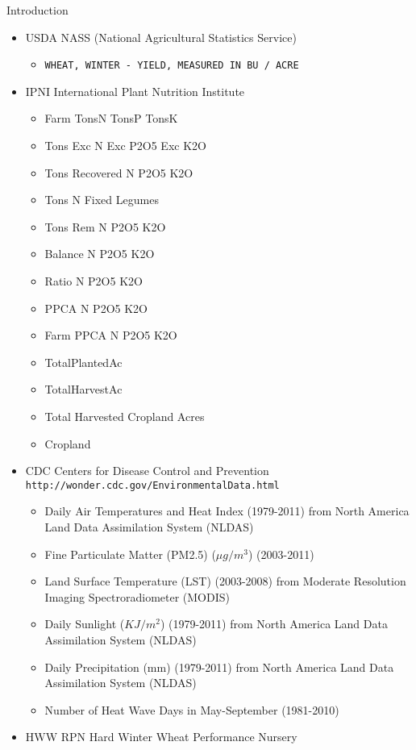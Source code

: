 \documentclass[final]{beamer}
\newlength{\onecolwid}
\begin{document}
\begin{frame}[t]
\begin{columns}[t]
\begin{column}{\onecolwid}
\begin{block}{Introduction}
\begin{itemize}
\item USDA NASS (National Agricultural Statistics Service)
   \begin{itemize}
      \item \texttt{WHEAT, WINTER - YIELD, MEASURED IN BU / ACRE}
   \end{itemize}
\item IPNI International Plant Nutrition Institute
   \begin{itemize}
      \item Farm 
         TonsN TonsP TonsK
      \item Tons Exc
         N Exc P2O5 Exc K2O 
      \item Tons Recovered
         N P2O5 K2O
      \item Tons N Fixed Legumes
      \item Tons Rem
            N P2O5 K2O
      \item Balance
            N P2O5 K2O
      \item Ratio
            N P2O5 K2O
      \item PPCA
            N P2O5 K2O
      \item Farm PPCA
            N P2O5 K2O
      \item TotalPlantedAc
      \item TotalHarvestAc
      \item Total Harvested Cropland Acres
      \item Cropland
   \end{itemize}
\item CDC Centers for Disease Control and Prevention
   \texttt{http://wonder.cdc.gov/EnvironmentalData.html}
   \begin{itemize}
      \item Daily Air Temperatures and Heat Index (1979-2011) 
         from North America Land Data Assimilation System (NLDAS) 
      \item Fine Particulate Matter (PM2.5) ($\mu g/m^3$) (2003-2011) 
      \item Land Surface Temperature (LST) (2003-2008) 
         from Moderate Resolution Imaging Spectroradiometer (MODIS) 
      \item Daily Sunlight ($KJ/m^2$) (1979-2011) 
         from North America Land Data Assimilation System (NLDAS) 
      \item Daily Precipitation (mm) (1979-2011) 
         from North America Land Data Assimilation System (NLDAS) 
      \item Number of Heat Wave Days in May-September (1981-2010)
   \end{itemize}
\item HWW RPN Hard Winter Wheat Performance Nursery 
\end{itemize}
\end{block}


\end{column}
\end{columns}
\end{frame}
\end{document}
